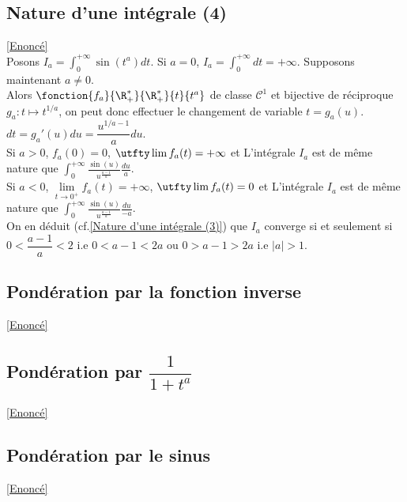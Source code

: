 \documentclass{book}
\begin{document}
	\subsection{Nature d'une intégrale (4) }
	\label{Nature d'une intégrale (4) corrigé}
	\textcolor{blue}{\hyperref[Nature d'une intégrale (4)]{[Enoncé]}}\\
	Posons $I_a=\displaystyle\int_0^{+\infty}\sin(t^a)dt$. Si $a=0$, $I_a=\displaystyle\int_0^{+\infty}dt=+\infty$. Supposons maintenant $a\ne 0$.\\
	Alors $\fonction{f_a}{\R^*_+}{\R^*_+}{t}{t^a}$ de classe $\mathcal C^1$ et bijective de réciproque $g_a:t\mapsto t^{1/a}$, on peut donc effectuer le changement de variable $t=g_a(u)$.\\
	$dt=g_a'(u)du=\dfrac{u^{1/a-1}}{a}du$.\\
	Si $a>0$, $f_a(0)=0$, $\utfty\lim f_a(t)=+\infty$ et
	L'intégrale $I_a$ est de même nature que $\displaystyle\int_0^{+\infty}\frac{\sin(u)}{u^{\frac{a-1}{a}}}\frac{du}{a}$.\\
	Si $a<0$, $\lim\limits_{t\to 0^+}f_a(t)=+\infty$, $\utfty\lim f_a(t)=0$ et
	L'intégrale $I_a$ est de même nature que $\displaystyle\int_0^{+\infty}\frac{\sin(u)}{u^{\frac{a-1}{a}}}\frac{du}{-a}$.\\
	On en déduit (cf.\ref{Nature d'une intégrale (3)}) que $I_a$ converge si et seulement si $0<\dfrac{a-1}{a}<2$ i.e $0<a-1<2a$ ou $0>a-1>2a$ i.e $|a|>1$.
	
	\subsection{Pondération par la fonction inverse}
	\label{Pondération par la fonction inverse corrigé}
	\textcolor{blue}{\hyperref[Pondération par la fonction inverse]{[Enoncé]}}\\
	
	\subsection{Pondération par $\dfrac{1}{1+t^a}$}
	\label{Pondération par 1/(1+t^a) corrigé}
	\textcolor{blue}{\hyperref[Pondération par 1/(1+t^a)]{[Enoncé]}}\\
	
	\subsection{Pondération par le sinus}
	\label{Pondération par le sinus corrigé}
	\textcolor{blue}{\hyperref[Pondération par le sinus]{[Enoncé]}}\\
	
\end{document}
